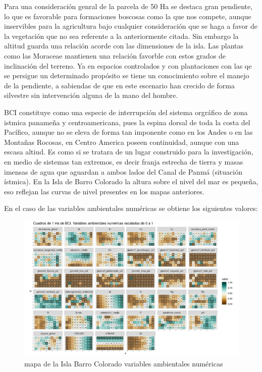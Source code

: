 \documentclass[11pt,]{article}
\begin{document}
Para una consideración genral de la parcela de 50 Ha se destaca gran
pendiente, lo que es favorable para formaciones boscosas como la que nos
compete, aunque inservibles para la agricultura bajo cualquier
consideración que se haga a favor de la vegetación que no sea referente
a la anteriormente citada. Sin embargo la altitud guarda una relación
acorde con las dimensiones de la isla. Las plantas como las Moraceae
mantienen una relación favorble con estos grados de inclinación del
terreno. Ya en espacios controlados y con plantaciones con las qe se
persigue un determinado propósito se tiene un conocimiento sobre el
manejo de la pendiente, a sabiendas de que en este escenario han crecido
de forma silvestre sin intervención alguna de la mano del hombre.

BCI constituye como una especie de interrupción del sistema orgráfico de
zona istmica panameña y centroamericana, pues la espina dorsal de toda
la costa del Pacífico, aunque no se eleva de forma tan imponente como en
los Andes o en las Montañas Rocosas, en Centro America poseen
continuidad, aunque con una escasa altiud. Es como si se tratara de un
lugar construido para la investigación, en medio de sistemas tan
extremos, es decir franja estrecha de tierra y masas imensas de agua que
aguardan a ambos lados del Canal de Panmá (situación ístmica). En la
Isla de Barro Colorado la altura sobre el nivel del mar es pequeña, eso
reflejan las curvas de nivel presentes en los mapas anteriores.

En el caso de las variables ambientales numéricas se obtiene los
siguientes valores:

\begin{figure}
\centering
\includegraphics[width=1.00000\textwidth]{mapas_variables_ambientales_numericas.png}
\caption{mapa de la Isla Barro Colorado variables ambientales numéricas
\label{fig:bci_map}}
\end{figure}
\end{document}
